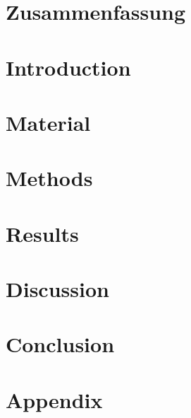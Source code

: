 \documentclass[
oneside,
a4paper,
12pt,
titlepage]
{article}
\begin{document}

\newpage


\newpage


\newpage

\section*{Zusammenfassung}


\pagestyle{standard}

\newpage
\section{Introduction}


\section{Material}



\section{Methods}






\section{Results}








\section{Discussion}







\section{Conclusion}


\newpage{}


\newpage{}
\setcounter{section}{0}
\renewcommand{\thesection}{\Alph{section}}
\section{Appendix}


\newpage{}

\end{document}
